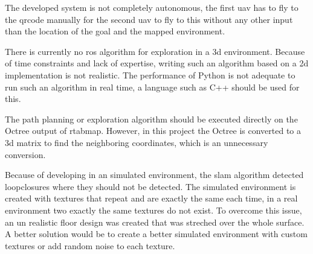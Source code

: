 The developed system is not completely autonomous, the first \acs{uav} has to fly to the \acs{qrcode} manually for the second \acs{uav} to fly to this without any other input than the location of the goal and the mapped environment.

There is currently no \acs{ros} algorithm for exploration in a \acs{3d} environment. Because of time constraints and lack of expertise, writing such an algorithm based on a \acs{2d} implementation is not realistic. The performance of Python is not adequate to run such an algorithm in real time, a language such as C++ should be used for this.

The path planning or exploration algorithm should be executed directly on the Octree output of \acs{rtabmap}. However, in this project the Octree is converted to a \acs{3d} matrix to find the neighboring coordinates, which is an unnecessary conversion.

Because of developing in an simulated environment, the \acs{slam} algorithm detected loopclosures where they should not be detected. The simulated environment is created with textures that repeat and are exactly the same each time, in a real environment two exactly the same textures do not exist. To overcome this issue, an un realistic floor design was created that was streched over the whole surface. A better solution would be to create a better simulated environment with custom textures or add random noise to each texture.